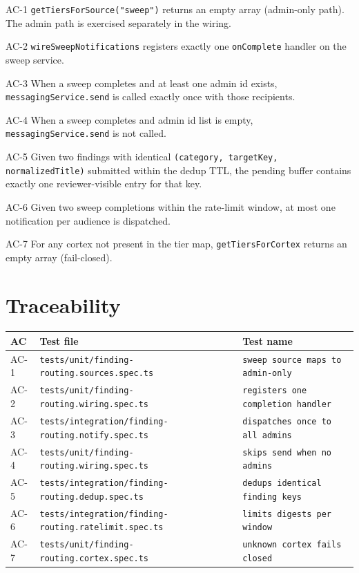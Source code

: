 \begin{ac}{AC-1}
\texttt{getTiersForSource("sweep")} returns an empty array (admin-only path). The admin path is exercised separately in the wiring.
\end{ac}
\begin{ac}{AC-2}
\texttt{wireSweepNotifications} registers exactly one \texttt{onComplete} handler on the sweep service.
\end{ac}
\begin{ac}{AC-3}
When a sweep completes and at least one admin id exists, \texttt{messagingService.send} is called exactly once with those recipients.
\end{ac}
\begin{ac}{AC-4}
When a sweep completes and admin id list is empty, \texttt{messagingService.send} is not called.
\end{ac}
\begin{ac}{AC-5}
Given two findings with identical \texttt{(category, targetKey, normalizedTitle)} submitted within the dedup TTL, the pending buffer contains exactly one reviewer-visible entry for that key.
\end{ac}
\begin{ac}{AC-6}
Given two sweep completions within the rate-limit window, at most one notification per audience is dispatched.
\end{ac}
\begin{ac}{AC-7}
For any cortex not present in the tier map, \texttt{getTiersForCortex} returns an empty array (fail-closed).
\end{ac}

\section{Traceability}

\begin{center}
\begin{tabular}{@{}lll@{}}
\toprule
AC & Test file & Test name \\
\midrule
AC-1 & \texttt{tests/unit/finding-routing.sources.spec.ts} & \texttt{sweep source maps to admin-only} \\
AC-2 & \texttt{tests/unit/finding-routing.wiring.spec.ts}  & \texttt{registers one completion handler} \\
AC-3 & \texttt{tests/integration/finding-routing.notify.spec.ts} & \texttt{dispatches once to all admins} \\
AC-4 & \texttt{tests/unit/finding-routing.wiring.spec.ts}  & \texttt{skips send when no admins} \\
AC-5 & \texttt{tests/integration/finding-routing.dedup.spec.ts}  & \texttt{dedups identical finding keys} \\
AC-6 & \texttt{tests/integration/finding-routing.ratelimit.spec.ts} & \texttt{limits digests per window} \\
AC-7 & \texttt{tests/unit/finding-routing.cortex.spec.ts}  & \texttt{unknown cortex fails closed} \\
\bottomrule
\end{tabular}
\end{center}

